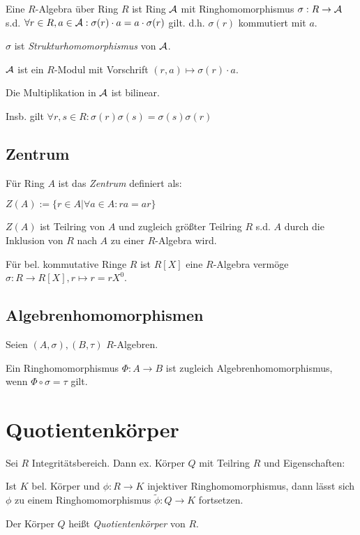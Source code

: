 Eine $R$-Algebra über Ring $R$ ist Ring $\mathcal{A}$ mit Ringhomomorphismus $\sigma : R \to \mathcal{A}$ s.d. $\forall r \in R, a \in \mathcal{A} : \sigma(r) \cdot a = a \cdot \sigma(r)$ gilt. d.h. $\sigma(r)$ kommutiert mit $a$.

$\sigma$ ist \emph{Strukturhomomorphismus} von $\mathcal{A}$.

$\mathcal{A}$ ist ein $R$-Modul mit Vorschrift $(r,a) \mapsto \sigma(r) \cdot a$.

Die Multiplikation in $\mathcal{A}$ ist bilinear.

Insb. gilt $\forall r, s \in R : \sigma(r)\sigma(s) = \sigma(s)\sigma(r)$

\subsection*{Zentrum}

Für Ring $A$ ist das \emph{Zentrum} definiert als:

$Z(A) := \{ r \in A | \forall a \in A : ra=ar \}$

$Z(A)$ ist Teilring von $A$ und zugleich größter Teilring $R$ s.d. $A$ durch die Inklusion von $R$ nach $A$ zu einer $R$-Algebra wird.

\vspace*{2mm}

Für bel. kommutative Ringe $R$ ist $R[X]$ eine $R$-Algebra vermöge $\sigma : R \to R[X], r \mapsto r = rX^0$.

\subsection*{Algebrenhomomorphismen}

Seien $(A, \sigma), (B, \tau)$ $R$-Algebren.

Ein Ringhomomorphismus $\Phi : A \to B$ ist zugleich Algebrenhomomorphismus, wenn $\Phi \circ \sigma = \tau$ gilt.

\section*{Quotientenkörper}

Sei $R$ Integritätsbereich. Dann ex. Körper $Q$ mit Teilring $R$ und Eigenschaften:

Ist $K$ bel. Körper und $\phi : R \to K$ injektiver Ringhomomorphismus, dann lässt sich $\phi$ zu einem Ringhomomorphismus $\tilde\phi : Q \to K$ fortsetzen.

Der Körper $Q$ heißt \emph{Quotientenkörper} von $R$.

